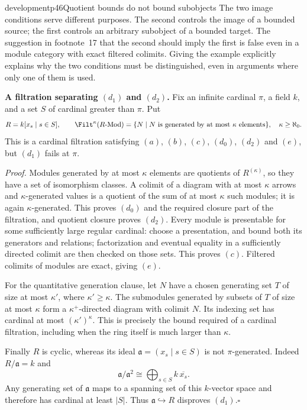 \begin{dcomment}{development}{p46}{Quotient bounds do not bound subobjects}
The two image conditions serve different purposes. The second controls the image of a bounded source; the first controls an arbitrary subobject of a bounded target. The suggestion in footnote~17 that the second should imply the first is false even in a module category with exact filtered colimits. Giving the example explicitly explains why the two conditions must be distinguished, even in arguments where only one of them is used.

\textbf{A filtration separating $(d_1)$ and $(d_2)$.}\ours
Fix an infinite cardinal $\pi$, a field $k$, and a set $S$ of cardinal greater than $\pi$. Put
\[
 R=k[x_s\mid s\in S],\qquad
 \Filt^{\kappa}(R\text{-}\mathrm{Mod})
 =\{N\mid N\text{ is generated by at most }\kappa\text{ elements}\},
 \quad \kappa\geq\aleph_0.
\]
This is a cardinal filtration satisfying $(a)$, $(b)$, $(c)$, $(d_0)$, $(d_2)$ and $(e)$, but $(d_1)$ fails at $\pi$.

\emph{Proof.} Modules generated by at most $\kappa$ elements are quotients of $R^{(\kappa)}$, so they have a set of isomorphism classes. A colimit of a diagram with at most $\kappa$ arrows and $\kappa$-generated values is a quotient of the sum of at most $\kappa$ such modules; it is again $\kappa$-generated. This proves $(d_0)$ and the required closure part of the filtration, and quotient closure proves $(d_2)$. Every module is presentable for some sufficiently large regular cardinal: choose a presentation, and bound both its generators and relations; factorization and eventual equality in a sufficiently directed colimit are then checked on those sets. This proves $(c)$. Filtered colimits of modules are exact, giving $(e)$.

For the quantitative generation clause, let $N$ have a chosen generating set $T$ of size at most $\kappa'$, where $\kappa'\geq\kappa$. The submodules generated by subsets of $T$ of size at most $\kappa$ form a $\kappa^+$-directed diagram with colimit $N$. Its indexing set has cardinal at most $(\kappa')^{\kappa}$. This is precisely the bound required of a cardinal filtration, including when the ring itself is much larger than $\kappa$.

Finally $R$ is cyclic, whereas its ideal $\mathfrak a=(x_s\mid s\in S)$ is not $\pi$-generated. Indeed $R/\mathfrak a=k$ and
\[
 \mathfrak a/\mathfrak a^2\cong\bigoplus_{s\in S}k\,\overline{x_s}.
\]
Any generating set of $\mathfrak a$ maps to a spanning set of this $k$-vector space and therefore has cardinal at least $|S|$. Thus $\mathfrak a\hookrightarrow R$ disproves $(d_1)$.\hfill$\square$


\end{dcomment}
